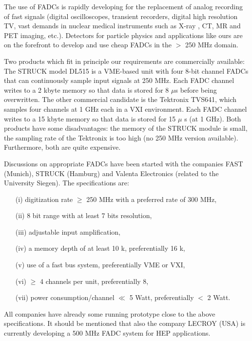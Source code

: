 The use of FADCs is rapidly developing for the replacement of analog
recording of fast signals (digital oscilloscopes, transient recorders,
digital high resolution TV, vast demands in nuclear medical instruments such
as X-ray , CT, MR and PET imaging, etc.). Detectors for particle physics and
applications like ours are on the forefront to develop and use cheap FADCs
in the $>$ 250 MHz domain.

Two products which fit in principle our requirements are commercially
available: The STRUCK model DL515 is a VME-based unit with four 8-bit
channel FADCs that can continuously sample input signals at 250 MHz. Each
FADC channel writes to a 2 kbyte memory so that data is stored for 8 $\mu$s
before being overwritten. The other commercial candidate is the Tektronix
TVS641, which samples four channels at 1 GHz each in a VXI environment. Each
FADC channel writes to a 15 kbyte memory so that data is stored for 15 $\mu$%
s (at 1 GHz). Both products have some disadvantages: the memory of the
STRUCK module is small, the sampling rate of the Tektronix is too high (no
250 MHz version available). Furthermore, both are quite expensive.

Discussions on appropriate FADCs have been started with the companies FAST
(Munich), STRUCK (Hamburg) and Valenta Electronics (related to the
University Siegen). The specifications are:

\begin{itemize}
\item[(i)]  digitization rate $\geq $ 250 MHz with a preferred rate of 300
MHz,

\item[(ii)]  8 bit range with at least 7 bits resolution,

\item[(iii)]  adjustable input amplification,

\item[(iv)]  a memory depth of at least 10 k, preferentially 16 k,

\item[(v)]  use of a fast bus system, preferentially VME or VXI,

\item[(vi)]  $\geq $ 4 channels per unit, preferentially 8,

\item[(vii)]  power consumption/channel $\ll $ 5 Watt, preferentially $<$ 2
Watt.
\end{itemize}

All companies have already some running prototype close to the above
specifications. It should be mentioned that also the company LECROY (USA) is
currently developing a 500 MHz FADC system for HEP applications.

